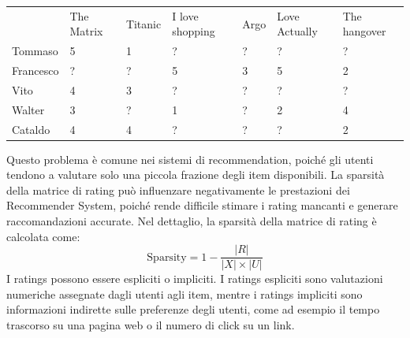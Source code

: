 \documentclass{report}
\begin{document}
	\begin{table}[H]
		\begin{tabular}{lllllll}
		 &
			The Matrix &
			Titanic &
			I love shopping &
			Argo &
			Love Actually &
			The hangover \\ \cline{2-7} 
		\multicolumn{1}{l|}{Tommaso} &
			\multicolumn{1}{l|}{5} &
			\multicolumn{1}{l|}{1} &
			\multicolumn{1}{l|}{\color{red}?} &
			\multicolumn{1}{l|}{\color{red}?} &
			\multicolumn{1}{l|}{\color{red}?} &
			\multicolumn{1}{l|}{\color{red}?} \\ \cline{2-7} 
		\multicolumn{1}{l|}{Francesco} &
			\multicolumn{1}{l|}{\color{red}?} &
			\multicolumn{1}{l|}{\color{red}?} &
			\multicolumn{1}{l|}{5} &
			\multicolumn{1}{l|}{3} &
			\multicolumn{1}{l|}{5} &
			\multicolumn{1}{l|}{2} \\ \cline{2-7} 
		\multicolumn{1}{l|}{Vito} &
			\multicolumn{1}{l|}{4} &
			\multicolumn{1}{l|}{3} &
			\multicolumn{1}{l|}{\color{red}?} &
			\multicolumn{1}{l|}{\color{red}?} &
			\multicolumn{1}{l|}{\color{red}?} &
			\multicolumn{1}{l|}{\color{red}?} \\ \cline{2-7} 
		\multicolumn{1}{l|}{Walter} &
			\multicolumn{1}{l|}{3} &
			\multicolumn{1}{l|}{\color{red}?} &
			\multicolumn{1}{l|}{1} &
			\multicolumn{1}{l|}{\color{red}?} &
			\multicolumn{1}{l|}{2} &
			\multicolumn{1}{l|}{4} \\ \cline{2-7} 
		\multicolumn{1}{l|}{Cataldo} &
			\multicolumn{1}{l|}{4} &
			\multicolumn{1}{l|}{4} &
			\multicolumn{1}{l|}{\color{red}?} &
			\multicolumn{1}{l|}{\color{red}?} &
			\multicolumn{1}{l|}{\color{red}?} &
			\multicolumn{1}{l|}{2} \\ \cline{2-7} 
		\end{tabular}
	\end{table}
	Questo problema è comune nei sistemi di recommendation, poiché gli utenti tendono a valutare solo una piccola frazione degli item disponibili. La sparsità della matrice di rating può influenzare negativamente le prestazioni dei Recommender System, poiché rende difficile stimare i rating mancanti e generare raccomandazioni accurate. Nel dettaglio, la sparsità della matrice di rating è calcolata come:
	\[
	\text{Sparsity} = 1 - \frac{|R|}{|X| \times |U|}
	\]
	I ratings possono essere espliciti o impliciti. I ratings espliciti sono valutazioni numeriche assegnate dagli utenti agli item, mentre i ratings impliciti sono informazioni indirette sulle preferenze degli utenti, come ad esempio il tempo trascorso su una pagina web o il numero di click su un link.
\end{document}
